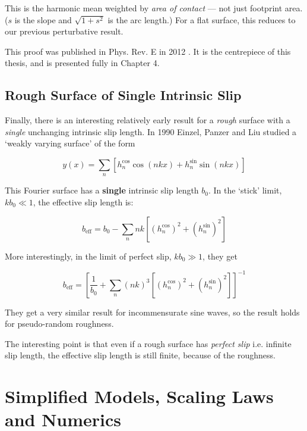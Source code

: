 \documentclass[a4paper]{report}
\newcommand{\beff}{\ensuremath{b_{\mathrm{eff}}}}
\begin{document}
This is the harmonic mean weighted by \emph{area of contact} --- not just footprint area.  ($s$ is the slope and $\sqrt{1+s^2}$ is the arc length.)  For a flat surface, this reduces to our previous perturbative result.

This proof was published in Phys. Rev. E in 2012 \cite{Lund2012}.  It is the centrepiece of this thesis, and is presented fully in Chapter 4.


\subsection*{Rough Surface of Single Intrinsic Slip}

Finally, there is an interesting relatively early result for a \emph{rough} surface with a \emph{single} unchanging intrinsic slip length.  In 1990 Einzel, Panzer and Liu \cite{EinzelPanzerLiu1990} studied a `weakly varying surface' of the form

\begin{equation*}
y(x) = \sum_n \left[ h_n^{\cos} \cos(nkx) + h_n^{\sin} \sin(nkx) \right]
\end{equation*} 

This Fourier surface has a \textbf{single} intrinsic slip length $b_0$.  In the `stick' limit, $kb_0 \ll 1$, the effective slip length is:

\begin{equation*}
\beff = b_0 - \sum_n nk \left[ (h_n^{\cos})^2 + (h_n^{\sin})^2  \right]
\end{equation*}

More interestingly, in the limit of perfect slip, $kb_0 \gg 1$, they get

\begin{equation*}
\beff = \left[ \frac{1}{b_0} + \sum_n (nk)^3 \left[ (h_n^{\cos})^2 + (h_n^{\sin})^2 \right]
 \right]^{-1}
\end{equation*}

They get a very similar result for incommensurate sine waves, so the result holds for pseudo-random roughness.

The interesting point is that even if a rough surface has \emph{perfect slip} i.e. infinite slip length, the effective slip length is still finite, because of the roughness.


\section*{Simplified Models, Scaling Laws and Numerics}
\end{document}
